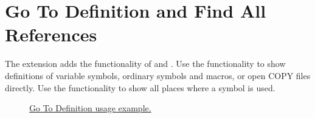 \section{Go To Definition and Find All References}
The extension adds the functionality of  and . Use the  functionality to show definitions of variable symbols, ordinary symbols and macros, or open COPY files directly. Use the  functionality to show all places where a symbol is used.

\begin{figure}[H]
	\centering
	\caption{\href{https://github.com/eclipse/che-che4z-lsp-for-hlasm/blob/master/readme\_res/go\_to\_def.gif}{Go To Definition usage example.}}
\end{figure}